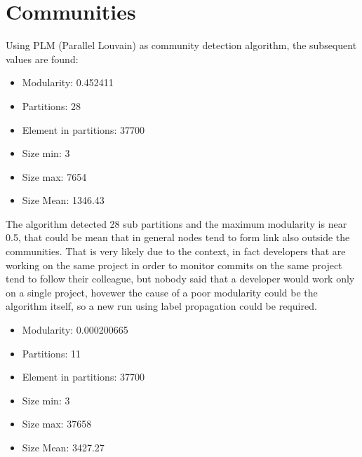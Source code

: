 \documentclass[]{article}
\begin{document}
    \section*{Communities}
    Using PLM (Parallel Louvain) as community detection algorithm, the subsequent values are found:
    \begin{itemize}
        \item Modularity: 0.452411
        \item Partitions: 28
        \item Element in partitions: 37700
        \item Size min: 3
        \item Size max: 7654
        \item Size Mean: 1346.43   
    \end{itemize}
    The algorithm detected 28 sub partitions and the maximum modularity is near 0.5, that could be mean that in general nodes tend to form link also outside the communities. That is very likely due to the context, in fact developers that are working on the same project in order to monitor commits on the same project tend to follow their colleague, but nobody said that a developer would work only on a single project, hovewer the cause of a poor modularity could be the algorithm itself, so a new run using label propagation could be required.
    
    \begin{itemize}
        \item Modularity: 0.000200665
        \item Partitions: 11
        \item Element in partitions: 37700
        \item Size min: 3
        \item Size max: 37658
        \item Size Mean: 3427.27
    \end{itemize}
\end{document}
